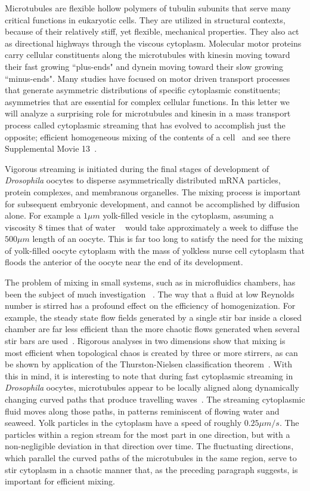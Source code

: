 \documentclass[pre,showpacs]{revtex4}
\begin{document}
Microtubules are flexible hollow polymers of tubulin subunits that
serve many critical functions in eukaryotic cells. They are utilized
in structural contexts, because of their relatively stiff, yet flexible,
mechanical properties.  They also act as directional highways through the
viscous cytoplasm. Molecular motor proteins carry cellular constituents
along the microtubules with kinesin moving toward their fast growing
``plus-ends" and dynein moving toward their slow growing ``minus-ends".
Many studies have focused on motor driven transport processes that
generate asymmetric distributions of specific cytoplasmic constituents;
asymmetries that are essential for complex cellular functions.  In this
letter we will analyze a surprising role for microtubules and kinesin in
a mass transport process called cytoplasmic streaming that has evolved
to accomplish just the opposite; efficient homogeneous mixing of the
contents of a cell~\cite{SerbusSaxton} and see there Supplemental Movie 13~\cite{Movie13}.


Vigorous streaming is initiated during the final stages of
development of {\em Drosophila} oocytes to disperse asymmetrically
distributed mRNA particles, protein complexes, and membranous
organelles.  The mixing process is important for subsequent
embryonic development, and cannot be accomplished by
diffusion alone.  For example  a $ 1\mu m$ yolk-filled vesicle in
the cytoplasm, assuming a viscosity 8 times that of water ~\cite{LubyPhelps}
would take approximately a week to diffuse the $500 \mu m$  length
of an oocyte. This is far too long to satisfy the need for the mixing
of yolk-filled oocyte cytoplasm with the mass of yolkless nurse
cell cytoplasm that floods the anterior of the oocyte near the
end of its development.

The problem of mixing in small systems, such as in microfluidics
chambers, has been the subject of much investigation ~\cite{Squires}. The
way that a fluid at low Reynolds number is stirred has a
profound effect on the efficiency of homogenization. For
example,  the steady state flow fields generated by a single
stir bar inside a closed chamber are far less efficient than
the more chaotic flows generated when  several stir bars are used~\cite{Aref,Aref2000}.
Rigorous analyses in two dimensions show that mixing is
most efficient when topological chaos is created by three or more
stirrers, as can be shown by application of the Thurston-Nielsen
classification theorem~\cite{Thurston,Fathi,Handel}.  With this in mind, it is
interesting to note that during fast cytoplasmic streaming in
{\em Drosophila} oocytes, microtubules appear to be locally aligned
along dynamically changing curved paths that produce travelling
waves~\cite{SerbusSaxton}.  
The streaming cytoplasmic fluid moves along those paths, in patterns reminiscent
of flowing water and seaweed.
Yolk particles in the
cytoplasm have a speed of roughly $0.25 \mu m/s$.  The particles
within a region stream for the most part in one direction,
but with a non-negligible deviation in that direction over
time. The fluctuating directions, which parallel the curved paths of
the microtubules in the same region, serve to stir cytoplasm
in a chaotic manner that, as the preceding paragraph suggests,
is important for efficient mixing.
\end{document}
